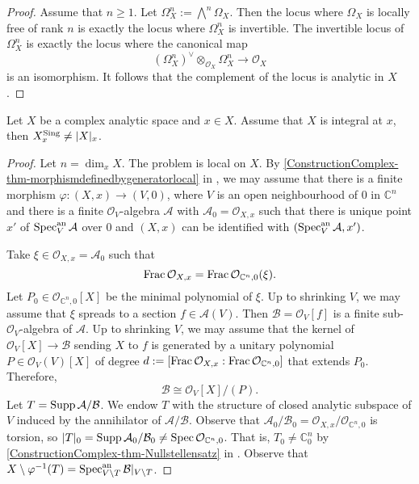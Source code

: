\begin{proof}
    Assume that $n\geq 1$. Let $\Omega_X^n:=\bigwedge^n \Omega_X$. Then the locus where $\Omega_X$ is locally free of rank $n$ is exactly the locus where $\Omega_X^n$ is invertible. The invertible locus of $\Omega_X^n$ is exactly the locus where the canonical map
    \[
        (\Omega_X^n)^{\vee}\otimes_{\mathcal{O}_X}\Omega_X^n\rightarrow \mathcal{O}_X
    \]
    is an isomorphism. It follows that the complement of the locus is analytic in $X$.
\end{proof}


\begin{thm}\label{thm-genericsmoothintegral}
    Let $X$ be a complex analytic space and $x\in X$. Assume that $X$ is integral at $x$, then $X^{\operatorname{Sing}}_x\neq |X|_x$.
\end{thm}
\begin{proof}
    Let $n=\dim_x X$. The problem is local on $X$.
    By \cref{ConstructionComplex-thm-morphismdefinedbygeneratorlocal} in , we may assume that there is a finite morphism $\varphi:(X,x)\rightarrow (V,0)$, where $V$ is an open neighbourhood of $0$ in $\mathbb{C}^n$ and there is a finite $\mathcal{O}_V$-algebra $\mathcal{A}$ with $\mathcal{A}_0=\mathcal{O}_{X,x}$ such that  there is unique point $x'$ of $\operatorname{Spec}^{\mathrm{an}}_V \mathcal{A}$ over $0$ and $(X,x)$ can be identified with $(\operatorname{Spec}^{\mathrm{an}}_V \mathcal{A},x')$.

    Take $\xi\in \mathcal{O}_{X,x}=\mathcal{A}_0$ such that 
    \[
        \operatorname{Frac} \mathcal{O}_{X,x}=\operatorname{Frac} \mathcal{O}_{\mathbb{C}^n,0}(\xi).
    \]
    Let $P_0\in \mathcal{O}_{\mathbb{C}^n,0}[X]$ be the minimal polynomial of $\xi$. 
    Up to shrinking $V$, we may assume that $\xi$ spreads to a section $f\in \mathcal{A}(V)$. Then $\mathcal{B}=\mathcal{O}_V[f]$ is a finite sub-$\mathcal{O}_V$-algebra of $\mathcal{A}$.  Up to shrinking $V$, we may assume that the kernel of $\mathcal{O}_V[X]\rightarrow \mathcal{B}$ sending $X$ to $f$ is generated by a unitary polynomial $P\in \mathcal{O}_V(V)[X]$ of degree $d:=[\operatorname{Frac} \mathcal{O}_{X,x}:\operatorname{Frac} \mathcal{O}_{\mathbb{C}^n,0}]$ that extends $P_0$. Therefore,
    \[
        \mathcal{B}\cong \mathcal{O}_V[X]/(P).  
    \]
    Let $T=\operatorname{Supp} \mathcal{A}/\mathcal{B}$. We endow $T$ with the structure of closed analytic subspace of $V$ induced by the annihilator of $\mathcal{A}/\mathcal{B}$.
    Observe that $\mathcal{A}_0/\mathcal{B}_0=\mathcal{O}_{X,x}/\mathcal{O}_{\mathbb{C}^n,0}$ is torsion, so $|T|_0=\operatorname{Supp} \mathcal{A}_0/\mathcal{B}_0\neq \operatorname{Spec} \mathcal{O}_{\mathbb{C}^n,0}$. That is, $T_0\neq \mathbb{C}^n_0$ by \cref{ConstructionComplex-thm-Nullstellensatz} in . 
    Observe that $X\setminus \varphi^{-1}(T)=\operatorname{Spec}_{V\setminus T}^{\mathrm{an}}\mathcal{B}|_{V\setminus T}$.


\end{proof}
